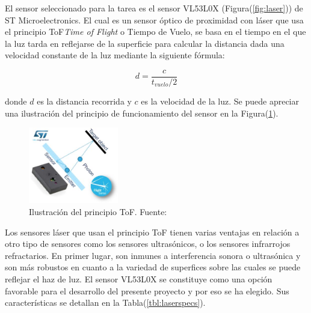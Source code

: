         El sensor seleccionado para la tarea es el sensor VL53L0X (Figura(\ref{fig:laser})) de ST Microelectronics. El cual es un sensor óptico de 
        proximidad con láser que usa el principio ToF{\textit{Time of Flight}} o Tiempo de Vuelo, se basa en el tiempo 
        en el que la luz tarda en reflejarse de la superficie para calcular la distancia dada una velocidad constante de la luz 
        mediante la siguiente fórmula:
        
        \begin{equation}\label{eq:tof}
            d = \frac{c}{t_{vuelo} / 2}
        \end{equation}

        donde $d$ es la distancia recorrida y $c$ es la velocidad de la luz. Se puede apreciar una ilustración del principio 
        de funcionamiento del sensor en la Figura(\ref{fig:tof}). 
        
        \begin{figure}[!h] 
            \centering
            \includegraphics[width=0.35\textwidth]{img/tof}
            \caption[Ilustración del principio ToF]{Ilustración del principio ToF. Fuente: \cite{laser} }
            \label{fig:tof}
        \end{figure}

        Los sensores láser que usan el principio ToF tienen varias ventajas en relación a otro tipo de sensores como los sensores 
        ultrasónicos, o los sensores infrarrojos refractarios. En primer lugar, son inmunes a interferencia sonora o ultrasónica 
        y son más robustos en cuanto a la variedad de superfices sobre las cuales se puede reflejar el haz de luz. El sensor 
        VL53L0X se constituye como una opción favorable para el desarrollo del presente proyecto y por eso se ha elegido. Sus 
        características se detallan en la Tabla(\ref{tbl:laserspecs}).

